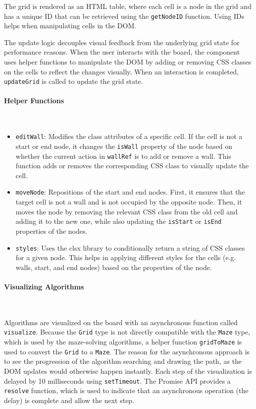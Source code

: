 The grid is rendered as an HTML table, where each cell is a node in the grid and has a unique ID that can be retrieved using the \texttt{getNodeID} function. Using IDs helps when manipulating cells in the DOM.

The update logic decouples visual feedback from the underlying grid state for performance reasons. When the user interacts with the board, the component uses helper functions to manipulate the DOM by adding or removing CSS classes on the cells to reflect the changes visually. When an interaction is completed, \texttt{updateGrid} is called to update the grid state.

\paragraph{Helper Functions} \

\begin{itemize}
    \item \texttt{editWall}: Modifies the class attributes of a specific cell. If the cell is not a start or end node, it changes the \texttt{isWall} property of the node based on whether the current action in \texttt{wallRef} is to add or remove a wall. This function adds or removes the corresponding CSS class to visually update the cell.
    \item \texttt{moveNode}: Repositions of the start and end nodes. First, it ensures that the target cell is not a wall and is not occupied by the opposite node. Then, it moves the node by removing the relevant CSS class from the old cell and adding it to the new one, while also updating the \texttt{isStart} or \texttt{isEnd} properties of the nodes.
    \item \texttt{styles}: Uses the clsx library to conditionally return a string of CSS classes for a given node. This helps in applying different styles for the cells (e.g. walls, start, and end nodes) based on the properties of the node.
\end{itemize}

\paragraph{Visualizing Algorithms} \

Algorithms are visualized on the board with an asynchronous function called \texttt{visualize}. Because the \texttt{Grid} type is not directly compatible with the \texttt{Maze} type, which is used by the maze-solving algorithms, a helper function \texttt{gridToMaze} is used to convert the \texttt{Grid} to a \texttt{Maze}. The reason for the asynchronous approach is to see the progression of the algorithm searching and drawing the path, as the DOM updates would otherwise happen instantly. Each step of the visualization is delayed by 10 milliseconds using \texttt{setTimeout}. The Promise API provides a \texttt{resolve} function, which is used to indicate that an asynchronous operation (the delay) is complete and allow the next step.


